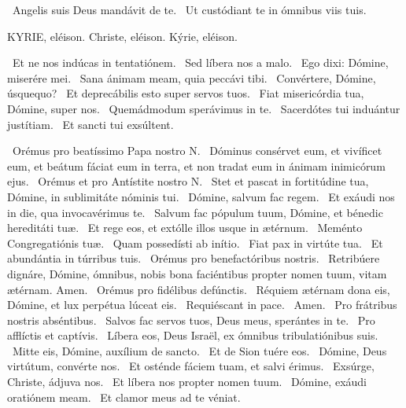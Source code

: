 \V\ Angelis suis Deus mandávit de te. \R\ Ut custódiant te in ómnibus viis tuis.




KYRIE, eléison. Christe, eléison. Kýrie, eléison.

 \V\ Et ne nos indúcas in tentatiónem. \R\ Sed líbera nos a malo. \V\ Ego dixi: Dómine, miserére mei. \R\ Sana ánimam meam, quia peccávi tibi. \V\ Convértere, Dómine, úsquequo? \R\ Et deprecábilis esto super servos tuos. \V\ Fiat misericórdia tua, Dómine, super nos. \R\ Quemádmodum sperávimus in te. \V\ Sacerdótes tui induántur justítiam. \R\ Et sancti tui exsúltent.

\V\ Orémus pro beatíssimo Papa nostro N. \R\ Dóminus consérvet eum, et vivíficet eum, et beátum fáciat eum in terra, et non tradat eum in ánimam inimicórum ejus. \V\ Orémus et pro Antístite nostro N. \R\ Stet et pascat in fortitúdine tua, Dómine, in sublimitáte nóminis tui. \V\ Dómine, salvum fac regem. \R\ Et exáudi nos in die, qua invocavérimus te. \V\ Salvum fac pópulum tuum, Dómine, et bénedic hereditáti tuæ. \R\ Et rege eos, et extólle illos usque in ætérnum. \V\ Meménto Congregatiónis tuæ. \R\ Quam possedísti ab inítio. \V\ Fiat pax in virtúte tua. \R\ Et abundántia in túrribus tuis. \V\ Orémus pro benefactóribus nostris. \R\ Retribúere dignáre, Dómine, ómnibus, nobis bona faciéntibus propter nomen tuum, vitam ætérnam. Amen. \V\ Orémus pro fidélibus defúnctis. \R\ Réquiem ætérnam dona eis, Dómine, et lux perpétua lúceat eis. \V\ Requiéscant in pace. \R\ Amen. \V\ Pro frátribus nostris abséntibus. \R\ Salvos fac servos tuos, Deus meus, sperántes in te. \V\ Pro afflíctis et captívis. \R\ Líbera eos, Deus Israël, ex ómnibus tribulatiónibus suis. \V\ Mitte eis, Dómine, auxílium de sancto. \R\ Et de Sion tuére eos. \V\ Dómine, Deus virtútum, convérte nos. \R\ Et osténde fáciem tuam, et salvi érimus. \V\ Exsúrge, Christe, ádjuva nos. \R\ Et líbera nos propter nomen tuum. \V\ Dómine, exáudi oratiónem meam. \R\ Et clamor meus ad te véniat.




